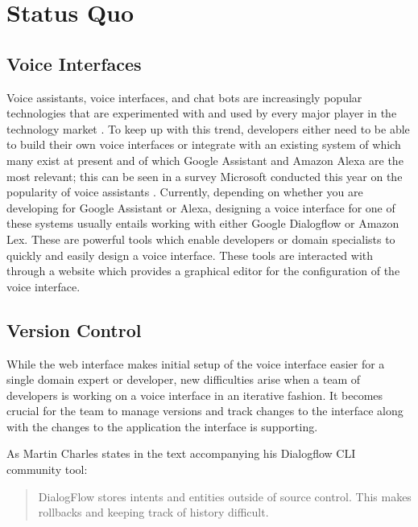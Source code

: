 \chapter{Status Quo}
\section{Voice Interfaces}
Voice assistants, voice interfaces, and chat bots are increasingly popular technologies \cite[page 8]{Olson2019} that are experimented with and used by every major player in the technology market \cite{Chatbots2018}. To keep up with this trend, developers either need to be able to build their own voice interfaces or integrate with an existing system of which many exist at present \cite{Alternativeto2019} and of which Google Assistant and Amazon Alexa are the most relevant; this can be seen in a survey Microsoft conducted this year on the popularity of voice assistants \cite[page 9]{Olson2019}.
Currently, depending on whether you are developing for Google Assistant or Alexa, designing a voice interface for one of these systems usually entails working with either Google Dialogflow or Amazon Lex. These are powerful tools which enable developers or domain specialists to quickly and easily design a voice interface.
These tools are interacted with through a website which provides a graphical editor for the configuration of the voice interface. 

\section{Version Control}
While the web interface makes initial setup of the voice interface easier for a single domain expert or developer, new difficulties arise when a team of developers is working on a voice interface in an iterative fashion. It becomes crucial for the team to manage versions and track changes to the interface along with the changes to the application the interface is supporting. 

As Martin Charles states in the text accompanying his Dialogflow CLI community tool:
\begin{quote}
    DialogFlow stores intents and entities outside of source control. This makes rollbacks and keeping track of history difficult. \cite[page 1]{0xcaff2018}
\end{quote} 

